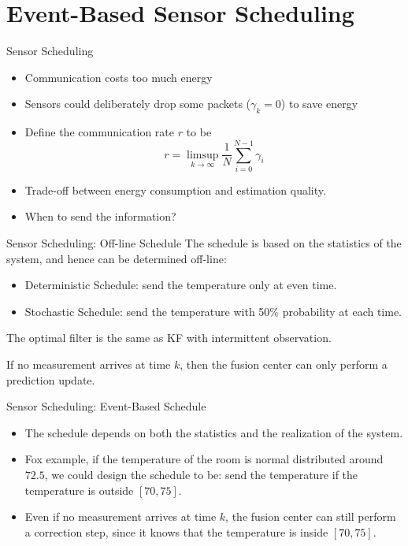 \documentclass[10pt]{beamer}
\begin{document}
  \section{Event-Based Sensor Scheduling}

  \frame{\tableofcontents[currentsection]}
  \begin{frame}{Sensor Scheduling}
    \begin{itemize}
      \item Communication costs too much energy
      \item Sensors could deliberately drop some packets ($\gamma_k = 0$) to save energy
      \item Define the communication rate $r$ to be
	\begin{displaymath}
	  r = \limsup_{k\rightarrow\infty}\frac{1}{N}\sum_{i=0}^{N-1}\gamma_i 
	\end{displaymath}
      \item Trade-off between energy consumption and estimation quality.
      \item When to send the information?
    \end{itemize}
  \end{frame}

  \begin{frame}{Sensor Scheduling: Off-line Schedule}
      The schedule is based on the statistics of the system, and hence can be determined off-line:
    \begin{itemize}
      \item Deterministic Schedule: send the temperature only at even time. 
      \item Stochastic Schedule: send the temperature with 50\% probability at each time. 
    \end{itemize}
    The optimal filter is the same as KF with intermittent observation.

    If no measurement arrives at time $k$, then the fusion center can only perform a prediction update.
  \end{frame}

  \begin{frame}{Sensor Scheduling: Event-Based Schedule}
    \begin{itemize}
      \item The schedule depends on both the statistics and the realization of the system. 
      \item Fox example, if the temperature of the room is normal distributed around $72.5$, we could design the schedule to be: send the temperature if the temperature is outside $[70,75]$.
      \item Even if no measurement arrives at time $k$, the fusion center can still perform a correction step, since it knows that the temperature is inside $[70,75]$.
    \end{itemize}
  \end{frame}
\end{document}
